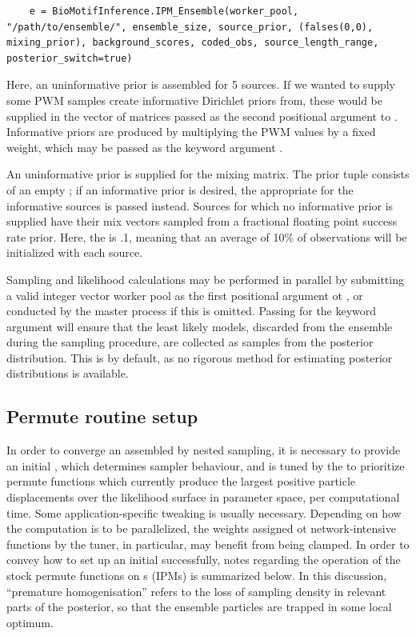 \documentclass{ut-thesis}
\begin{document}
\begin{NoHyper}
\begin{verbatim}
    e = BioMotifInference.IPM_Ensemble(worker_pool, "/path/to/ensemble/", ensemble_size, source_prior, (falses(0,0), mixing_prior), background_scores, coded_obs, source_length_range, posterior_switch=true)
\end{verbatim}

Here, an uninformative prior is assembled for 5 sources. If we wanted to supply some PWM samples create informative Dirichlet priors from, these would be supplied in the vector of matrices passed as the second positional argument to . Informative priors are produced by multiplying the PWM values by a fixed weight, which may be passed as the keyword argument .

An uninformative prior is supplied for the mixing matrix. The prior tuple consists of an empty ; if an informative prior is desired, the appropriate  for the informative sources is passed instead. Sources for which no informative prior is supplied have their mix vectors sampled from a fractional floating point success rate prior. Here, the  is .1, meaning that an average of 10\% of observations will be initialized with each source.

Sampling and likelihood calculations may be performed in parallel by submitting a valid integer vector worker pool as the first positional argument ot , or conducted by the master process if this is omitted. Passing  for the keyword argument  will ensure that the least likely models, discarded from the ensemble during the sampling procedure, are collected as samples from the posterior distribution. This is  by default, as no rigorous method for estimating posterior distributions is available.

\subsection{Permute routine setup}
\label{ssec:adhoc}
In order to converge an assembled  by nested sampling, it is necessary to provide an initial , which determines sampler behaviour, and is tuned by the  to prioritize permute functions which currently produce the largest positive particle displacements over the likelihood surface in parameter space, per computational time. Some application-specific tweaking is usually necessary. Depending on how the computation is to be parallelized, the weights assigned ot network-intensive functions by the tuner, in particular, may benefit from being clamped. In order to convey how to set up an initial  successfully, notes regarding the operation of the stock permute functions on s (IPMs) is summarized below. In this discussion, ``premature homogenisation'' refers to the loss of sampling density in relevant parts of the posterior, so that the ensemble particles are trapped in some local optimum.


\end{NoHyper}
\end{document}
